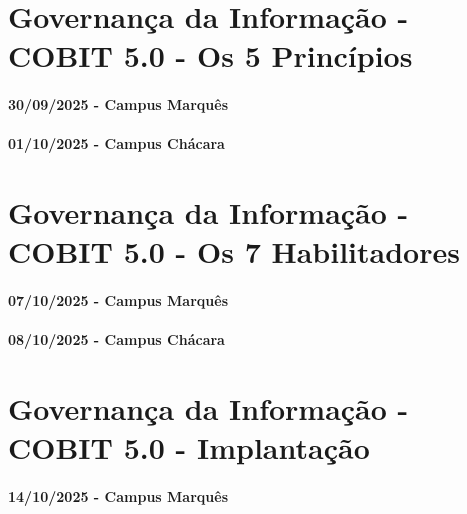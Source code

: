 \documentclass[
]{book}
\begin{document}
\chapter{Governança da Informação - COBIT 5.0 - Os 5 Princípios}\label{governanuxe7a-da-informauxe7uxe3o---cobit-5.0---os-5-princuxedpios}

\subsubsection*{30/09/2025 - Campus Marquês}\label{campus-marquuxeas-7}

\subsubsection*{01/10/2025 - Campus Chácara}\label{campus-chuxe1cara-7}

\chapter{Governança da Informação - COBIT 5.0 - Os 7 Habilitadores}\label{governanuxe7a-da-informauxe7uxe3o---cobit-5.0---os-7-habilitadores}

\subsubsection*{07/10/2025 - Campus Marquês}\label{campus-marquuxeas-8}

\subsubsection*{08/10/2025 - Campus Chácara}\label{campus-chuxe1cara-8}

\chapter{Governança da Informação - COBIT 5.0 - Implantação}\label{governanuxe7a-da-informauxe7uxe3o---cobit-5.0---implantauxe7uxe3o}

\subsubsection*{14/10/2025 - Campus Marquês}\label{campus-marquuxeas-9}
\end{document}
